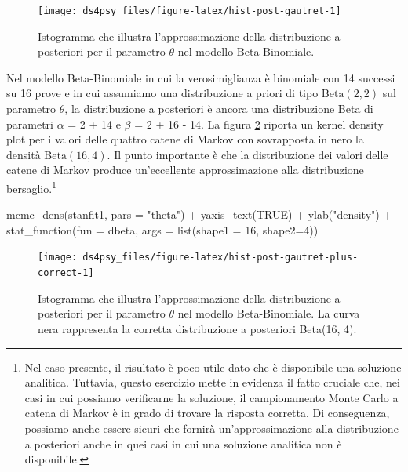 \documentclass[
  11pt,
]{krantz}
\makeatletter
\newenvironment{Shaded}{\begin{snugshade}}{\end{snugshade}}
\newcommand{\AttributeTok}[1]{\textcolor[rgb]{0.61,0.61,0.61}{#1}}
\newcommand{\ConstantTok}[1]{\textcolor[rgb]{0,0,0}{#1}}
\newcommand{\DecValTok}[1]{\textcolor[rgb]{0.06,0.06,0.06}{#1}}
\newcommand{\FunctionTok}[1]{\textcolor[rgb]{0,0,0}{#1}}
\newcommand{\NormalTok}[1]{#1}
\newcommand{\SpecialCharTok}[1]{\textcolor[rgb]{0,0,0}{#1}}
\newcommand{\StringTok}[1]{\textcolor[rgb]{0.5,0.5,0.5}{#1}}
\newenvironment{kframe}{%
\medskip{}
\setlength{\fboxsep}{.8em}
 \def\at@end@of@kframe{}%
 \ifinner\ifhmode%
  \def\at@end@of@kframe{\end{minipage}}%
  \begin{minipage}{\columnwidth}%
 \fi\fi%
 \def\FrameCommand##1{\hskip\@totalleftmargin \hskip-\fboxsep
 \colorbox{shadecolor}{##1}\hskip-\fboxsep
     \hskip-\linewidth \hskip-\@totalleftmargin \hskip\columnwidth}%
 \MakeFramed {\advance\hsize-\width
   \@totalleftmargin\z@ \linewidth\hsize
   \@setminipage}}%
 {\par\unskip\endMakeFramed%
 \at@end@of@kframe}
\renewenvironment{Shaded}{\begin{kframe}}{\end{kframe}}
\theoremstyle{definition}
\theoremstyle{definition}
\theoremstyle{definition}
\theoremstyle{definition}
\theoremstyle{remark}
\makeatother
\begin{document}
\begin{figure}[h]

{\centering \texttt{[image: ds4psy\_files/figure-latex/hist-post-gautret-1]} 

}

\caption{Istogramma che illustra l'approssimazione della distribuzione a posteriori per il parametro $\theta$ nel modello Beta-Binomiale.}\label{fig:hist-post-gautret}
\end{figure}

Nel modello Beta-Binomiale in cui la verosimiglianza è binomiale con 14 successi su 16 prove e in cui assumiamo una distribuzione a priori di tipo \(\mbox{Beta}(2, 2)\) sul parametro \(\theta\), la distribuzione a posteriori è ancora una distribuzione Beta di parametri \(\alpha\) = 2 + 14 e \(\beta\) = 2 + 16 - 14. La figura \ref{fig:hist-post-gautret-plus-correct} riporta un kernel density plot per i valori delle quattro catene di Markov con sovrapposta in nero la densità \(\mbox{Beta}(16, 4)\). Il punto importante è che la distribuzione dei valori delle catene di Markov produce un'eccellente approssimazione alla distribuzione bersaglio.\footnote{Nel caso presente, il risultato è poco utile dato che è disponibile una soluzione analitica. Tuttavia, questo esercizio mette in evidenza il fatto cruciale che, nei casi in cui possiamo verificarne la soluzione, il campionamento Monte Carlo a catena di Markov è in grado di trovare la risposta corretta. Di conseguenza, possiamo anche essere sicuri che fornirà un'approssimazione alla distribuzione a posteriori anche in quei casi in cui una soluzione analitica non è disponibile.}

\begin{Shaded}
\begin{Highlighting}[]
\FunctionTok{mcmc\_dens}\NormalTok{(stanfit1, }\AttributeTok{pars =} \StringTok{"theta"}\NormalTok{) }\SpecialCharTok{+} 
  \FunctionTok{yaxis\_text}\NormalTok{(}\ConstantTok{TRUE}\NormalTok{) }\SpecialCharTok{+} 
  \FunctionTok{ylab}\NormalTok{(}\StringTok{"density"}\NormalTok{) }\SpecialCharTok{+}
  \FunctionTok{stat\_function}\NormalTok{(}\AttributeTok{fun =}\NormalTok{ dbeta, }\AttributeTok{args =} \FunctionTok{list}\NormalTok{(}\AttributeTok{shape1 =} \DecValTok{16}\NormalTok{, }\AttributeTok{shape2=}\DecValTok{4}\NormalTok{))}
\end{Highlighting}
\end{Shaded}

\begin{figure}[h]

{\centering \texttt{[image: ds4psy\_files/figure-latex/hist-post-gautret-plus-correct-1]} 

}

\caption{Istogramma che illustra l'approssimazione della distribuzione a posteriori per il parametro $\theta$ nel modello Beta-Binomiale. La curva nera rappresenta la corretta distribuzione a posteriori Beta(16, 4).}\label{fig:hist-post-gautret-plus-correct}
\end{figure}
\end{document}
